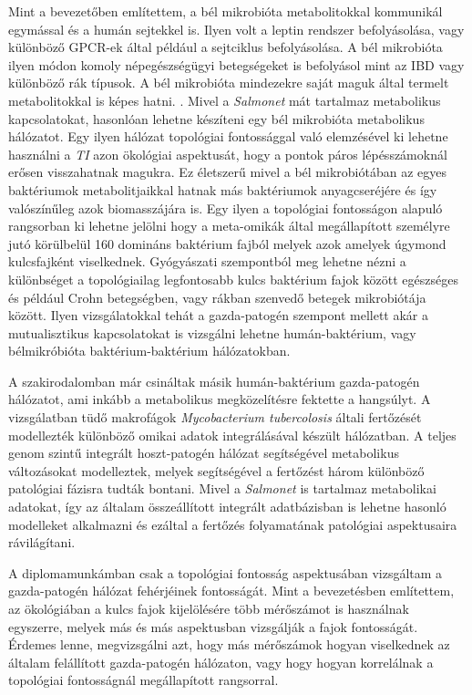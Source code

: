 \documentclass[a4paper,12pt]{article}
\begin{document}
		Mint a bevezetőben említettem, a bél mikrobióta metabolitokkal kommunikál egymással és a humán sejtekkel is. Ilyen volt a leptin rendszer befolyásolása, vagy különböző GPCR-ek által például a sejtciklus befolyásolása. \cite{buthyrate_immune} A bél mikrobióta ilyen módon komoly népegészségügyi betegségeket is befolyásol mint az IBD vagy különböző rák típusok. \cite{gut_microbiome} A bél mikrobióta mindezekre saját maguk által termelt metabolitokkal is képes hatni. \cite{scfa_and_vitamine}. Mivel a \textit{Salmonet} mát tartalmaz metabolikus kapcsolatokat, hasonlóan lehetne készíteni egy bél mikrobióta metabolikus hálózatot. Egy ilyen hálózat topológiai fontossággal való elemzésével ki lehetne használni a \textit{TI} azon ökológiai aspektusát, hogy a pontok páros lépésszámoknál erősen visszahatnak magukra. Ez életszerű mivel a bél mikrobiótában az egyes baktériumok metabolitjaikkal hatnak más baktériumok anyagcseréjére és így valószínűleg azok biomasszájára is. \cite{gut_microbiome} Egy ilyen a topológiai fontosságon alapuló rangsorban ki lehetne jelölni hogy a meta-omikák által megállapított személyre jutó körülbelül 160 domináns baktérium fajból \cite{meta_omics} melyek azok amelyek úgymond kulcsfajként viselkednek. Gyógyászati szempontból meg lehetne nézni a különbséget a topológiailag legfontosabb kulcs baktérium fajok között egészséges és például Crohn betegségben, vagy rákban szenvedő betegek mikrobiótája között. Ilyen vizsgálatokkal tehát a gazda-patogén szempont mellett akár a mutualisztikus kapcsolatokat is vizsgálni lehetne humán-baktérium, vagy bélmikróbióta baktérium-baktérium hálózatokban.
 
 		A szakirodalomban már csináltak másik humán-baktérium gazda-patogén hálózatot, ami inkább a metabolikus megközelítésre fektette a hangsúlyt. A vizsgálatban tüdő makrofágok \textit{Mycobacterium tubercolosis} általi fertőzését modellezték különböző omikai adatok integrálásával készült hálózatban. A teljes genom szintű integrált hoszt-patogén hálózat segítségével metabolikus változásokat modelleztek, melyek segítségével a fertőzést három különböző patológiai fázisra tudták bontani. \cite{discussion_alveolar_macrophage} Mivel a \textit{Salmonet} is tartalmaz metabolikai adatokat, így az általam összeállított integrált adatbázisban is lehetne hasonló modelleket alkalmazni és ezáltal a fertőzés folyamatának patológiai aspektusaira rávilágítani.
		
		A diplomamunkámban csak a topológiai fontosság aspektusában vizsgáltam a gazda-patogén hálózat fehérjéinek fontosságát. Mint a bevezetésben említettem, az ökológiában a kulcs fajok kijelölésére több mérőszámot is használnak egyszerre, melyek más és más aspektusban vizsgálják a fajok fontosságát.\cite{jordan_comparison} \cite{ti} Érdemes lenne, megvizsgálni azt, hogy más mérőszámok hogyan viselkednek az általam felállított gazda-patogén hálózaton, vagy hogy hogyan korrelálnak a topológiai fontosságnál megállapított rangsorral.
\end{document}
